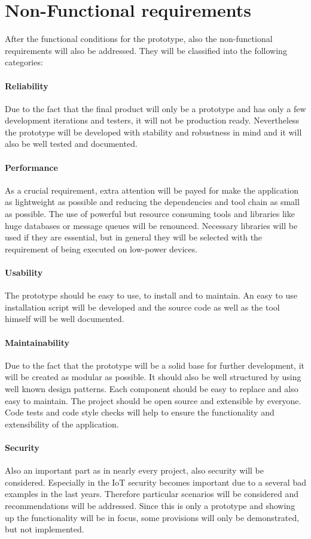 \section{Non-Functional requirements}
\label{section:non-functional-requirements}
After the functional conditions for the prototype, also the non-functional requirements will also be addressed.
They will be classified into the following categories:

\paragraph{Reliability} Due to the fact that the final product will only be a prototype and has only a few development iterations and testers, it will not be production ready. Nevertheless the prototype will be developed with stability and robustness in mind and it will also be well tested and documented.
\paragraph{Performance} As a crucial requirement, extra attention will be payed for make the application as lightweight as possible and reducing the dependencies and tool chain as small as possible.
The use of powerful but resource consuming tools and libraries like huge databases or message queues will be renounced.
Necessary libraries will be used if they are essential, but in general they will be selected with the requirement of being executed on low-power devices.
\paragraph{Usability} The prototype should be easy to use, to install and to maintain.
An easy to use installation script will be developed and the source code as well as the tool himself will be well documented.
\paragraph{Maintainability} Due to the fact that the prototype will be a solid base for further development, it will be created as modular as possible.
It should also be well structured by using well known design patterns.
Each component should be easy to replace and also easy to maintain.
The project should be open source and extensible by everyone.
Code tests and code style checks will help to ensure the functionality and extensibility of the application.
\paragraph{Security} Also an important part as in nearly every project, also security will be considered.
Especially in the \ac{IoT} security becomes important due to a several bad examples in the last years.%
Therefore particular scenarios will be considered and recommendations will be addressed.
Since this is only a prototype and showing up the functionality will be in focus, some provisions will only be demonstrated, but not implemented.
